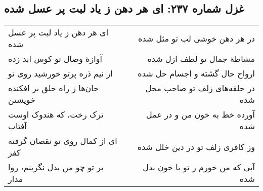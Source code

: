 \begin{center}
\section*{غزل شماره ۲۳۷: ای هر دهن ز یاد لبت پر عسل شده}
\label{sec:237}
\begin{longtable}{l p{0.5cm} r}
ای هر دهن ز یاد لبت پر عسل شده
&&
در هر دهن خوشی لب تو مثل شده
\\
آوازهٔ وصال تو کوس ابد زده
&&
مشاطهٔ جمال تو لطف ازل شده
\\
از نیم ذره پرتو خورشید روی تو
&&
ارواح حال گشته و اجسام حل شده
\\
جان‌ها ز راه حلق بر افکنده خویشتن
&&
در حلقه‌های زلف تو صاحب محل شده
\\
ترک رخت، که هندوک اوست آفتاب
&&
آورده خط به خون من و در عمل شده
\\
ای از کمال روی تو نقصان گرفته کفر
&&
وز کافری زلف تو در دین خلل شده
\\
بر تو چو من بدل نگزینم، روا مدار
&&
آبی که من خورم ز تو با خون بدل شده
\\
\end{longtable}
\end{center}
